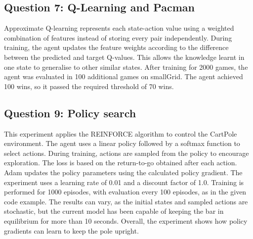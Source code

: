 \documentclass[11pt,a4paper]{article}
\begin{document}
\subsection{Question 7: Q-Learning and Pacman}
Approximate Q-learning represents each state-action value using a weighted combination of features instead of storing every pair independently.
During training, the agent updates the feature weights according to the difference between the predicted and target Q-values.
This allows the knowledge learnt in one state to generalise to other similar states.
After training for 2000 games, the agent was evaluated in 100 additional games on smallGrid.
The agent achieved 100 wins, so it passed the required threshold of 70 wins.

\subsection{Question 9: Policy search}
This experiment applies the REINFORCE algorithm to control the CartPole environment.
The agent uses a linear policy followed by a softmax function to select actions.
During training, actions are sampled from the policy to encourage exploration.
The loss is based on the return-to-go obtained after each action.
Adam updates the policy parameters using the calculated policy gradient.
The experiment uses a learning rate of 0.01 and a discount factor of 1.0.
Training is performed for 1000 episodes, with evaluation every 100 episodes, as in the given code example.
The results can vary, as the initial states and sampled actions are stochastic, but the current model has been capable of keeping the bar in equilibrium for more than 10 seconds.
Overall, the experiment shows how policy gradients can learn to keep the pole upright.
\end{document}

